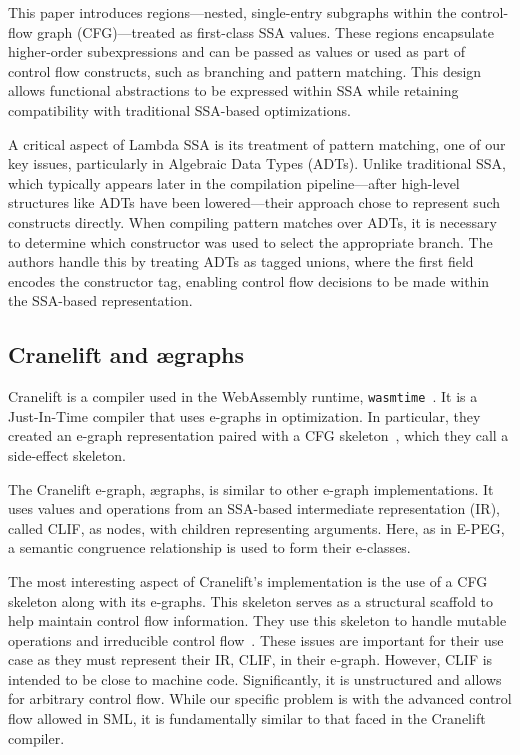 \documentclass{article}
\begin{document}
This paper introduces regions—nested, single-entry subgraphs within the control-flow graph (CFG)—treated as first-class SSA values. These regions encapsulate higher-order subexpressions and can be passed as values or used as part of control flow constructs, such as branching and pattern matching. This design allows functional abstractions to be expressed within SSA while retaining compatibility with traditional SSA-based optimizations.

A critical aspect of Lambda SSA is its treatment of pattern matching, one of our key issues, particularly in Algebraic Data Types (ADTs). Unlike traditional SSA, which typically appears later in the compilation pipeline—after high-level structures like ADTs have been lowered—their approach chose to represent such constructs directly. When compiling pattern matches over ADTs, it is necessary to determine which constructor was used to select the appropriate branch. The authors handle this by treating ADTs as tagged unions, where the first field encodes the constructor tag, enabling control flow decisions to be made within the SSA-based representation.


\subsection{Cranelift and \ae graphs}

Cranelift is a compiler used in the WebAssembly runtime, \verb|wasmtime|~\cite{bytecodealliance_2025}. It is a Just-In-Time compiler that uses e-graphs in optimization. In particular, they created an e-graph representation paired with a CFG skeleton~\cite{fallin_2022}, which they call a side-effect skeleton.

The Cranelift e-graph, \ae graphs, is similar to other e-graph implementations. It uses values and operations from an SSA-based intermediate representation (IR), called CLIF, as nodes, with children representing arguments. Here, as in E-PEG, a semantic congruence relationship is used to form their e-classes.

The most interesting aspect of Cranelift's implementation is the use of a CFG skeleton along with its e-graphs. This skeleton serves as a structural scaffold to help maintain control flow information. They use this skeleton to handle mutable operations and irreducible control flow~\cite{fallin2023aegraphs}. These issues are important for their use case as they must represent their IR, CLIF, in their e-graph. However, CLIF is intended to be close to machine code. Significantly, it is unstructured and allows for arbitrary control flow. While our specific problem is with the advanced control flow allowed in SML, it is fundamentally similar to that faced in the Cranelift compiler.
\end{document}
